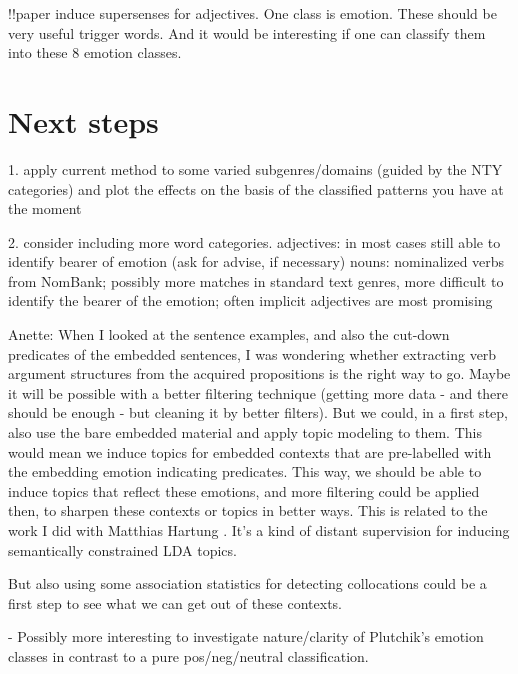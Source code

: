 !!paper \citep{adjective_supersenses} induce supersenses for adjectives. One class is emotion. These should be very useful trigger words. And it would be interesting if one can classify them into these 8 emotion classes. 



\section{Next steps}

1. apply current method to some varied subgenres/domains (guided by the NTY categories) and plot the effects on the basis of the classified patterns you have at the moment

2. consider including more word categories.
adjectives: in most cases still able to identify bearer of emotion (ask for advise, if necessary)
nouns: nominalized verbs from NomBank; possibly more matches in standard text genres, more difficult to identify the bearer of the emotion; often implicit
adjectives are most promising

Anette:
When I looked at the sentence examples, and also the cut-down predicates of the embedded sentences, I was wondering whether extracting verb argument structures from the acquired propositions is the right way to go. Maybe it will be possible with a better filtering technique (getting more data - and there should be enough - but cleaning it by better filters). But we could, in a first step, also use the bare embedded material and apply topic modeling to them. This would mean we induce topics for embedded contexts that are pre-labelled with the embedding emotion indicating predicates. This way, we should be able to induce topics that reflect these emotions, and more filtering could be applied then, to sharpen these contexts or topics in better ways. This is related to the work I did with Matthias Hartung \cite{hartung2011exploring}. It's a kind of distant supervision for inducing semantically constrained LDA topics.

But also using some association statistics for detecting collocations could be a first step to see what we can get out of these contexts.


- Possibly more interesting to investigate nature/clarity of Plutchik's emotion classes in contrast to a pure pos/neg/neutral classification. 




